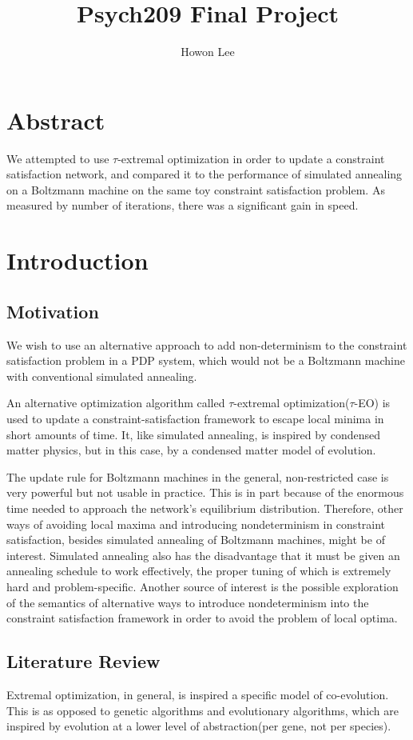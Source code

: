 \documentclass[12pt]{article}
\begin{document}
\title{Psych209 Final Project}
\author{Howon Lee}
\maketitle
\section*{Abstract}
We attempted to use $\tau$-extremal optimization in order to update a constraint satisfaction network, and compared it to the performance of simulated annealing on a Boltzmann machine on the same toy constraint satisfaction problem. As measured by number of iterations, there was a significant gain in speed.
\section*{Introduction}

\subsection*{Motivation}
We wish to use an alternative approach to add non-determinism to the constraint satisfaction problem in a PDP system, which would not be a Boltzmann machine with conventional simulated annealing.

An alternative optimization algorithm called $\tau$-extremal optimization($\tau$-EO) is used to update a constraint-satisfaction framework to escape local minima in short amounts of time. It, like simulated annealing, is inspired by condensed matter physics, but in this case, by a condensed matter model of evolution.

The update rule for Boltzmann machines in the general, non-restricted case is very powerful but not usable in practice. This is in part because of the enormous time needed to approach the network's equilibrium distribution. Therefore, other ways of avoiding local maxima and introducing nondeterminism in constraint satisfaction, besides simulated annealing of Boltzmann machines, might be of interest. Simulated annealing also has the disadvantage that it must be given an annealing schedule to work effectively, the proper tuning of which is extremely hard and problem-specific. Another source of interest is the possible exploration of the semantics of alternative ways to introduce nondeterminism into the constraint satisfaction framework in order to avoid the problem of local optima.

\subsection*{Literature Review}
Extremal optimization, in general, is inspired a specific model of co-evolution. This is as opposed to genetic algorithms and evolutionary algorithms, which are inspired by evolution at a lower level of abstraction(per gene, not per species).
\end{document}
